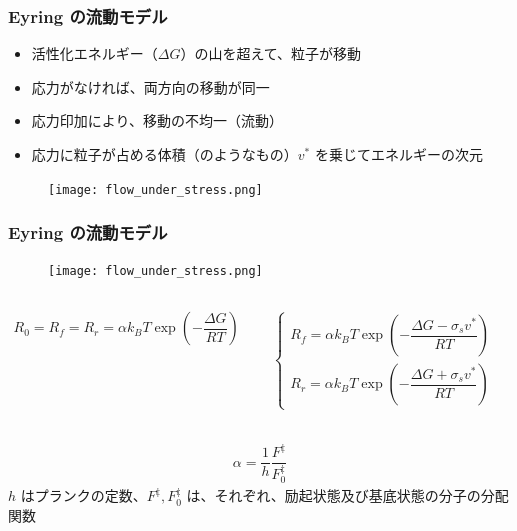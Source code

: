 \documentclass[1４pt, dvipdfmx]{beamer}
\begin{document}
	

\begin{frame}
\frametitle{Eyring の流動モデル}

\begin{itemize}
\item 活性化エネルギー（$\Delta G$）の山を超えて、粒子が移動
\item 応力がなければ、両方向の移動が同一
\item 応力印加により、移動の不均一（流動）
\item 応力に粒子が占める体積（のようなもの）$v^*$ を乗じてエネルギーの次元
\end{itemize}

\begin{figure}
 \centering
	\texttt{[image: flow\_under\_stress.png]}
\end{figure}
\end{frame}



\begin{frame}
\frametitle{Eyring の流動モデル}
    \begin{figure}
    \centering
        \texttt{[image: flow\_under\_stress.png]}
    \end{figure}
    \footnotesize
    \begin{columns}[totalwidth=.8\textwidth]
            \begin{align*}
            R_0 = R_f = R_r = \alpha k_B T \exp \left( - \dfrac{\Delta G}{RT} \right)
            \end{align*}

            \begin{align*}
            \begin{cases}
            R_f = \alpha k_B T \exp \left( - \dfrac{\Delta G - \sigma_s v^*}{RT} \right)\\[12pt]
            R_r = \alpha k_B T \exp \left( - \dfrac{\Delta G + \sigma_s v^*}{RT} \right)
            \end{cases}
            \end{align*}
	\end{columns}
	
	\begin{align*}
	\alpha = \dfrac{1}{h} \dfrac{F^{\ddag}}{F_0^{\ddag}} 
	\end{align*}
	$h$ はプランクの定数、$F^{\ddag}, F_0^{\ddag}$ は、それぞれ、励起状態及び基底状態の分子の分配関数
\end{frame}
\end{document}
